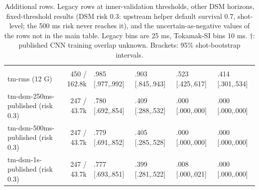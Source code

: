 \begin{table}[t]
\begin{tabular}{>{\raggedright\arraybackslash}p{1.75in}rllll}
\midrule
\multicolumn{6}{l}{\emph{Tokamak-SI labels, fixed thresholds, uncertain time excluded}} \\
tm-rms (12 G) & 450 / 162.8k & .985 [.977,.992] & .903 [.845,.943] & .523 [.425,.617] & .414 [.301,.534] \\
tm-dsm-250ms-published (risk 0.3) & 247 / 43.7k & .780 [.692,.854] & .409 [.288,.532] & .000 [.000,.000] & .000 [.000,.000] \\
tm-dsm-500ms-published (risk 0.3) & 247 / 43.7k & .779 [.691,.852] & .405 [.285,.528] & .000 [.000,.000] & .000 [.000,.000] \\
tm-dsm-1s-published (risk 0.3) & 247 / 43.7k & .777 [.693,.851] & .399 [.281,.522] & .008 [.000,.021] & .000 [.000,.000] \\
\bottomrule
\end{tabular}
\caption{Additional rows. Legacy rows at inner-validation thresholds, other DSM horizons, fixed-threshold results (DSM risk 0.3: upstream helper default survival 0.7, shot-level; the 500 ms risk never reaches it), and the uncertain-as-negative values of the rows not in the main table. Legacy bins are 25 ms, Tokamak-SI bins 10 ms. $\dagger$: published CNN training overlap unknown. Brackets: 95\% shot-bootstrap intervals.}
\label{tab:tm-benchmark-appendix}
\end{table}
